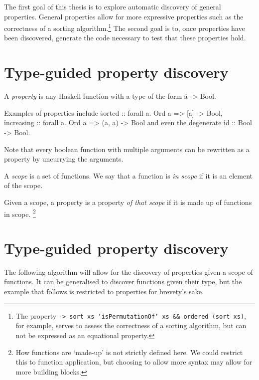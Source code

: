 \documentclass[a4paper, 11pt]{article}
\begin{document}
The first goal of this thesis is to explore automatic discovery of general properties.
General properties allow for more expressive properties such as the correctness of a sorting algorithm.\footnote{The property \texttt{\xs -> sort xs `isPermutationOf` xs && ordered (sort xs)}, for example, serves to assess the correctness of a sorting algorithm, but can not be expressed as an equational property.}
The second goal is to, once properties have been discovered, generate the code necessary to test that these properties hold.

\newpage

\section{Type-guided property discovery}

\begin{de}
  A \emph{property} is any Haskell function with a type of the form \h{a -> Bool}.
\end{de}

\begin{ex}
  Examples of properties include \h{sorted :: forall a. Ord a => [a] -> Bool}, \h{increasing :: forall a. Ord a => (a, a) -> Bool} and even the degenerate \h{id :: Bool -> Bool}.

  Note that every boolean function with multiple arguments can be rewritten as a property by uncurrying the arguments.
\end{ex}

\begin{de}
  A \emph{scope} is a set of functions.
  We say that a function is \emph{in scope} if it is an element of the scope.
\end{de}

\begin{de}
  Given a scope, a property is a property \emph{of that scope} if it is made up of functions in scope.
  \footnote{How functions are `made-up' is not strictly defined here. We could restrict this to function application, but choosing to allow more syntax may allow for more building blocks.}
\end{de}

\section{Type-guided property discovery}

The following algorithm will allow for the discovery of properties given a scope of functions.
It can be generalised to discover functions given their type, but the example that follows is restricted to properties for brevety's sake.
\end{document}
